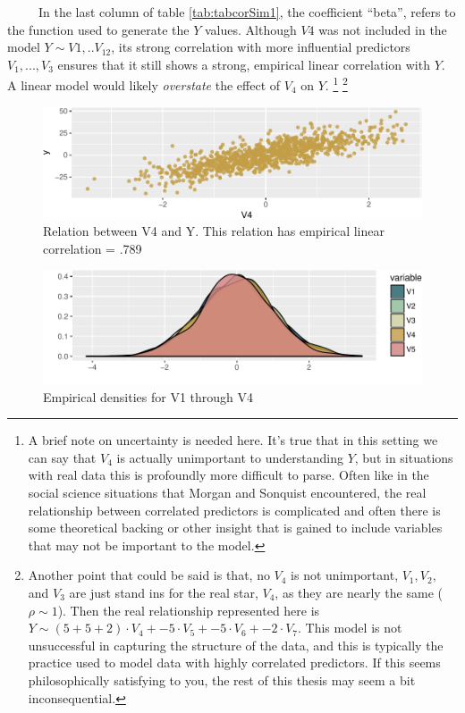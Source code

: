 \documentclass[12pt,twoside]{reedthesis}
\begin{document}
  ~~~~~In the last column of table \ref{tab:tabcorSim1}, the coefficient
  ``beta'', refers to the function used to generate the \(Y\) values.
  Although \(V4\) was not included in the model \(Y \sim V1,..V_{12}\),
  its strong correlation with more influential predictors \(V_1,...,V_3\)
  ensures that it still shows a strong, empirical linear correlation with
  \(Y\). A linear model would likely \emph{overstate} the effect of
  \(V_4\) on \(Y\). \footnote{A brief note on uncertainty is needed here.
    It's true that in this setting we can say that \(V_4\) is actually
    unimportant to understanding \(Y\), but in situations with real data
    this is profoundly more difficult to parse. Often like in the social
    science situations that Morgan and Sonquist encountered, the real
    relationship between correlated predictors is complicated and often
    there is some theoretical backing or other insight that is gained to
    include variables that may not be important to the model.} \footnote{Another
    point that could be said is that, no \(V_4\) is not unimportant,
    \(V_1, V_2,\) and \(V_3\) are just stand ins for the real star,
    \(V_4\), as they are nearly the same (\(\rho \sim 1\)). Then the real
    relationship represented here is
    \(Y \sim (5 + 5 + 2) \cdot V_4 + -5 \cdot V_5 + -5 \cdot V_6 + -2 \cdot V_7\).
    This model is not unsuccessful in capturing the structure of the data,
    and this is typically the practice used to model data with highly
    correlated predictors. If this seems philosophically satisfying to
    you, the rest of this thesis may seem a bit inconsequential.}
  
  \begin{figure}[htbp]
  \centering
  \includegraphics{Thesis_files/figure-latex/figdenv4y-1.pdf}
  \caption{\label{fig:figdenv4y}Relation between V4 and Y. This relation has
  empirical linear correlation = .789}
  \end{figure}
  
  \begin{figure}[htbp]
  \centering
  \includegraphics{Thesis_files/figure-latex/unnamed-chunk-11-1.pdf}
  \caption{\label{fig:unnamed-chunk-11}\label{fig:figdenv1v5}Empirical
  densities for V1 through V4}
  \end{figure}
  
\end{document}
